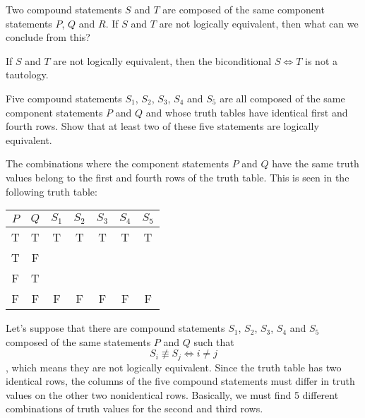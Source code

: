 \documentclass[12pt]{article}
\newenvironment{problem}[2][Problem]{\begin{trivlist}
		\item[\hskip \labelsep {\bfseries #1}\hskip \labelsep {\bfseries #2.}]}{\end{trivlist}}
\newenvironment{solution}[2][Solution]{\begin{trivlist}
		\item[\hskip \labelsep {\bfseries #1}\hskip \labelsep {\bfseries #2.}]}{\end{trivlist}}
\begin{document}
\begin{problem}{56}
	Two compound statements $S$ and $T$ are composed of the same component statements $P$, $Q$ and $R$. If $S$ and $T$ are not logically equivalent, then what can we conclude from this?
	\begin{solution}{}
		If $S$ and $T$ are not logically equivalent, then the biconditional $S \Leftrightarrow T$ is not a tautology.
	\end{solution}
\end{problem}

\begin{problem}{57}
	Five compound statements $S_1$, $S_2$, $S_3$, $S_4$ and $S_5$ are all composed of the same component statements $P$ and $Q$ and whose truth tables have identical first and fourth rows. Show that at least two of these five statements are logically equivalent.
	
	\begin{solution}{}
		The combinations where the component statements $P$ and $Q$ have the same truth values belong to the first and fourth rows of the truth table. This is seen in the following truth table:
		\begin{center}
			\begin{tabular}{c c c c c c c}
				$P$ & $Q$ & $S_1$ & $S_2$ & $S_3$ & $S_4$ & $S_5$\\
				\hline
				T & T & T & T & T & T & T\\
				T & F &   &   &   &   &   \\
				F & T &   &   &   &   &   \\
				F & F & F  & F & F  & F  & F  \\
				\hline
			\end{tabular}
		\end{center}
		Let's suppose that there are compound statements $S_1$, $S_2$, $S_3$, $S_4$ and $S_5$ composed of the same statements $P$ and $Q$ such that
		\begin{equation}\label{nonequiv}
			S_i \not\equiv S_j \Leftrightarrow i\neq j
		\end{equation}
	, which means they are not logically equivalent. Since the truth table has two identical rows, the columns of the five compound statements must differ in truth values on the other two nonidentical rows. Basically, we must find 5 different combinations of truth values for the second and third rows.
	

\end{solution}
\end{problem}
\end{document}
